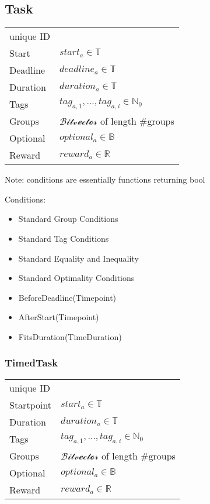 \subsection{Task}
\begin{tabular}{|p{3.5cm}||p{5cm}|}
\hline
   unique ID    &  \\
   Start        & $start_a\in\mathbb{T}$ \\
   Deadline     & $deadline_a\in\mathbb{T}$ \\
   Duration  	& $duration_a\in\mathbb{T}$ \\
   Tags         & $tag_{a,1},...,tag_{a,i}\in\mathbb{N}_0$ \\	
   Groups       & $\mathcal{Bitvector}$ of length \#groups \\ 
   Optional     & $optional_a\in\mathbb{B}$\\
   Reward		& $reward_a \in \mathbb{R}$\\
\hline
\end{tabular}

Note: conditions are essentially functions returning bool

Conditions:
\begin{itemize}
\item Standard Group Conditions
\item Standard Tag Conditions
\item Standard Equality and Inequality
\item Standard Optimality Conditions
\item BeforeDeadline(Timepoint)
\item AfterStart(Timepoint)
\item FitsDuration(TimeDuration)
\end{itemize}

\subsubsection{TimedTask}
\begin{tabular}{|p{3.5cm}||p{5cm}|}
\hline
   unique ID    &  \\
   Startpoint   & $start_a\in\mathbb{T}$ \\
   Duration  	& $duration_a\in\mathbb{T}$ \\
   Tags         & $tag_{a,1},...,tag_{a,i}\in\mathbb{N}_0$ \\	
   Groups       & $\mathcal{Bitvector}$ of length \#groups \\ 
   Optional     & $optional_a\in\mathbb{B}$\\
   Reward		& $reward_a \in \mathbb{R}$\\
\hline
\end{tabular}



